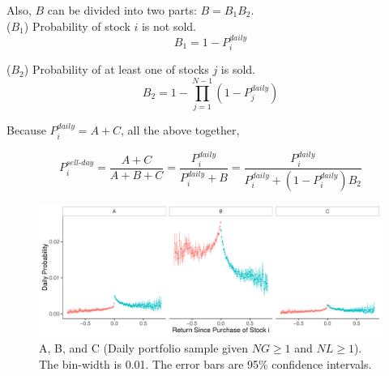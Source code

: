 \documentclass[11pt, a4paper]{article}
\newcommand{\HS}[1]{\textcolor{blue}{HS: #1}}
\begin{document}
\begin{appendices}
Also, $B$ can be divided into two parts: $B=B_1B_2$.\\

\noindent
($B_{1}$) Probability of stock $i$ is not sold.
\begin{equation}
\label{eq:B1}
B_1 = 1-P^{daily}_{i}
\end{equation}

\noindent
($B_{2}$) Probability of at least one of stocks $j$ is sold.
\begin{equation}
\label{eq:B2}
B_2 = 1-\prod_{j=1}^{N-1}(1-P^{daily}_{j})
\end{equation}

\noindent

Because $P^{daily}_{i} = A+C$, all the above together,

\begin{equation}
\label{eq:PABC}
P^{sell\mbox{-}day}_{i} = \frac{A+C}{A+B+C} = \frac{P^{daily}_{i}}{P^{daily}_{i}+B} = \frac{P^{daily}_{i}}{P^{daily}_{i}+(1-P^{daily}_{i})B_2}
\end{equation}



\begin{figure}[H]
	\centering
	\includegraphics[width=1\columnwidth]{barc_ABC_NG1_NL1_3.pdf}
	\caption{\small A, B, and C (Daily portfolio sample given $NG\geq1$ and $NL\geq1$). The bin-width is 0.01. The error bars are 95\% confidence intervals.}
	\label{figure:prop_ABC_NG1NL1}
\end{figure}


\end{appendices}
\end{document}
